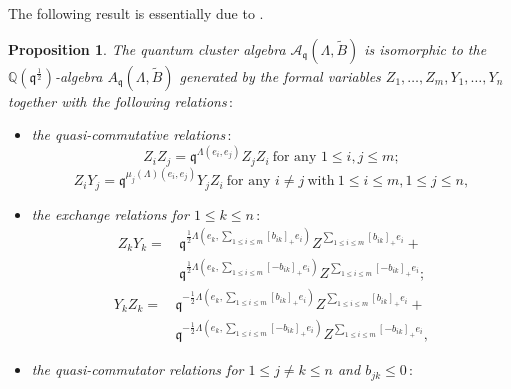 \documentclass[reqno,12pt]{amsart}
\numberwithin{equation}{section}
\theoremstyle{plain} %
\newtheorem{proposition}[theorem]{\bf Proposition}
\theoremstyle{definition} %
\begin{document}
The following result is essentially due to \cite{BZ05}.
\begin{proposition}\label{prop:quantum-cluster-presentation}
The quantum cluster algebra $\mathcal{A}_{\mathfrak{q}}(\Lambda,\widetilde{B})$ is isomorphic to the $\mathbb{Q}(\mathfrak{q}^{\frac{1}{2}})$-algebra $A_{\mathfrak{q}}(\Lambda,\widetilde{B})$ generated by the formal variables $Z_1,\ldots, Z_m,Y_1,\ldots, Y_n$ together with the following relations\,$:$
\begin{itemize}
    \item the quasi-commutative relations\,$:$
    \begin{equation}\label{gen-rel: quasi-comm-1}
        Z_iZ_j=\mathfrak{q}^{\Lambda(e_i,e_j)}Z_jZ_i~ \text{for~any~}1\leq i,j\leq m;
    \end{equation}
    \begin{equation}\label{gen-rel: quasi-comm-2}
        Z_iY_j=\mathfrak{q}^{\mu_j(\Lambda)(e_i,e_j)}Y_jZ_i ~ \text{for~any~}i\neq j~\text{with}~1\leq i\leq m, 1\leq j\leq n,
    \end{equation}
    \item the exchange relations for $1\leq k\leq n$\,$:$
    \begin{equation}
    \begin{split}\label{gen-rel: exchange-relation-left}
        Z_kY_k=\,&\mathfrak{q}^{\frac{1}{2}\Lambda(e_k,\sum_{1\leq i\leq m}[b_{ik}]_+e_i)}Z^{\sum_{1\leq i\leq m}[b_{ik}]_+e_i}+\\
&\mathfrak{q}^{\frac{1}{2}\Lambda(e_k,\sum_{1\leq i\leq m}[-b_{ik}]_+e_i)}Z^{\sum_{1\leq i\leq m}[-b_{ik}]_+e_i};
    \end{split}
    \end{equation}
    \begin{equation}
        \begin{split}\label{gen-rel: exchange-relation-right}
         Y_kZ_k=\,&\mathfrak{q}^{-\frac{1}{2}\Lambda(e_k,\sum_{1\leq i\leq m}[b_{ik}]_+e_i)}Z^{\sum_{1\leq i\leq m}[b_{ik}]_+e_i}+\\
&\mathfrak{q}^{-\frac{1}{2}\Lambda(e_k,\sum_{1\leq i\leq m}[-b_{ik}]_+e_i)}Z^{\sum_{1\leq i\leq m}[-b_{ik}]_+e_i},
    \end{split}
    \end{equation}
    \item the quasi-commutator relations for $1\leq j\neq k\leq n$ and $b_{jk}\leq 0$\,$:$
    \begin{equation}\label{gen-rel: quasi-commutation}
    \begin{split}

\end{split}
\end{equation}
\end{itemize}
\end{proposition}
\end{document}
